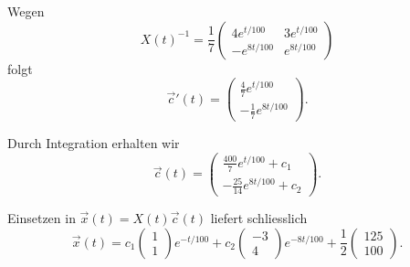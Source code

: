 \begin{enumerate}
          Wegen
          \[
              X(t)^{-1}
              =\frac17
              \begin{pmatrix}
                  4e^{t/100}  & 3e^{t/100} \\
                  -e^{8t/100} & e^{8t/100}
              \end{pmatrix}
          \]
          folgt
          \[
              \vec c'(t)
              =\begin{pmatrix}
                  \frac47 e^{t/100} \\[1mm]
                  -\frac17 e^{8t/100}
              \end{pmatrix}.
          \]

          Durch Integration erhalten wir
          \[
              \vec c(t)=
              \begin{pmatrix}
                  \frac{400}{7}e^{t/100}+c_1 \\[1mm]
                  -\frac{25}{14}e^{8t/100}+c_2
              \end{pmatrix}.
          \]

          Einsetzen in \(\vec x(t)=X(t)\vec c(t)\) liefert
          schliesslich
          \[
              \boxed{
                  \vec x(t)
                  =c_1\begin{pmatrix}1\\1\end{pmatrix}e^{-t/100}
                  +c_2\begin{pmatrix}-3\\4\end{pmatrix}e^{-8t/100}
                  +\frac12\begin{pmatrix}125\\100\end{pmatrix}.
              }
          \]
\end{enumerate}
